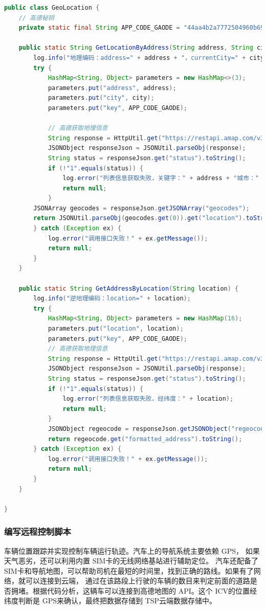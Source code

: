 \begin{lstlisting}[language=Java,title={代码块2: 获取汽车经纬度地理位置}]
  public class GeoLocation {
    // 高德秘钥
    private static final String APP_CODE_GAODE = "44aa4b2a7772504960b691cfb9802";

    public static String GetLocationByAddress(String address, String city) {
        log.info("地理编码：address=" + address + "，currentCity=" + city);
        try {
            HashMap<String, Object> parameters = new HashMap<>(3);
            parameters.put("address", address);
            parameters.put("city", city);
            parameters.put("key", APP_CODE_GAODE);

            // 高德获取地理信息
            String response = HttpUtil.get("https://restapi.amap.com/v3/geocode/geo", parameters);
            JSONObject responseJson = JSONUtil.parseObj(response);
            String status = responseJson.get("status").toString();
            if (!"1".equals(status)) {
                log.error("列表信息获取失败，关键字：" + address + "城市：" + city);
                return null;
            }
        JSONArray geocodes = responseJson.getJSONArray("geocodes");
        return JSONUtil.parseObj(geocodes.get(0)).get("location").toString();
        } catch (Exception ex) {
            log.error("调用接口失败！" + ex.getMessage());
            return null;
        }
    }

    public static String GetAddressByLocation(String location) {
        log.info("逆地理编码：location=" + location);
        try {
            HashMap<String, Object> parameters = new HashMap(16);
            parameters.put("location", location);
            parameters.put("key", APP_CODE_GAODE);
            // 高德获取地理信息
            String response = HttpUtil.get("https://restapi.amap.com/v3/geocode/regeo", parameters);
            JSONObject responseJson = JSONUtil.parseObj(response);
            String status = responseJson.get("status").toString();
            if (!"1".equals(status)) {
                log.error("列表信息获取失败，经纬度：" + location);
                return null;
            }
            JSONObject regeocode = responseJson.getJSONObject("regeocode");
            return regeocode.get("formatted_address").toString();
        } catch (Exception ex) {
            log.error("调用接口失败！" + ex.getMessage());
            return null;
        }
    }

}
  \end{lstlisting}
\subsubsection{编写远程控制脚本}
车辆位置跟踪并实现控制车辆运行轨迹。汽车上的导航系统主要依赖 GPS，
如果天气恶劣，还可以利用内置 SIM卡的无线网络基站进行辅助定位。
汽车还配备了 SIM卡和导航地图，可以帮助司机在最短的时间里，找到正确的路线。如果有了网络，就可以连接到云端，
通过在该路段上行驶的车辆的数目来判定前面的道路是否拥堵。根据代码分析，这辆车可以连接到高德地图的 API。这个 ICV的位置经纬度判断是
GPS来确认，最终把数据存储到 TSP云端数据存储中。

